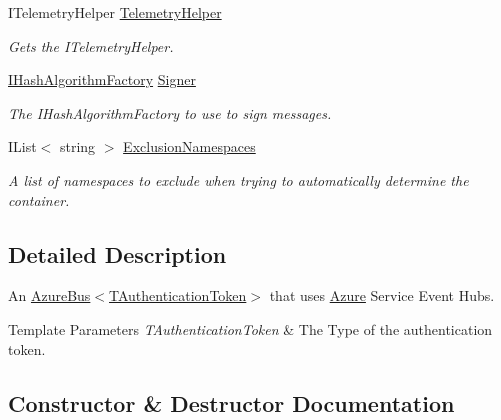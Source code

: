 \begin{DoxyCompactItemize}
I\+Telemetry\+Helper \hyperlink{classCqrs_1_1Azure_1_1ServiceBus_1_1AzureEventHub_a4cf19edac088c5ea74408398b3dfd4a2_a4cf19edac088c5ea74408398b3dfd4a2}{Telemetry\+Helper}
\begin{DoxyCompactList}\small\item\em Gets the I\+Telemetry\+Helper. \end{DoxyCompactList}\item 
\hyperlink{interfaceCqrs_1_1Bus_1_1IHashAlgorithmFactory}{I\+Hash\+Algorithm\+Factory} \hyperlink{classCqrs_1_1Azure_1_1ServiceBus_1_1AzureEventHub_a001a89909f92a45909cb95c2c0acf9fa_a001a89909f92a45909cb95c2c0acf9fa}{Signer}
\begin{DoxyCompactList}\small\item\em The I\+Hash\+Algorithm\+Factory to use to sign messages. \end{DoxyCompactList}\item 
I\+List$<$ string $>$ \hyperlink{classCqrs_1_1Azure_1_1ServiceBus_1_1AzureEventHub_ad25a0f517a33a99e4ae645bf14c3f7d9_ad25a0f517a33a99e4ae645bf14c3f7d9}{Exclusion\+Namespaces}
\begin{DoxyCompactList}\small\item\em A list of namespaces to exclude when trying to automatically determine the container. \end{DoxyCompactList}\end{DoxyCompactItemize}


\subsection{Detailed Description}
An \hyperlink{classCqrs_1_1Azure_1_1ServiceBus_1_1AzureBus_a1046ff74282fd178f43e28420433d2a9_a1046ff74282fd178f43e28420433d2a9}{Azure\+Bus$<$\+T\+Authentication\+Token$>$} that uses \hyperlink{namespaceCqrs_1_1Azure}{Azure} Service Event Hubs. 


\begin{DoxyTemplParams}{Template Parameters}
{\em T\+Authentication\+Token} & The Type of the authentication token.\\
\hline
\end{DoxyTemplParams}


\subsection{Constructor \& Destructor Documentation}
\mbox{\label{classCqrs_1_1Azure_1_1ServiceBus_1_1AzureEventHub_a2b548165ac5b1e3d0312af5c62e3c6cd_a2b548165ac5b1e3d0312af5c62e3c6cd}} 
